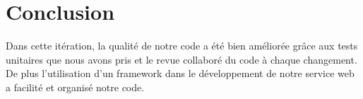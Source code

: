 \section*{Conclusion}

Dans cette itération, la qualité de notre code a été bien améliorée grâce aux
tests unitaires que nous avons pris et le revue collaboré du code à chaque
changement. De plus l'utilisation d'un framework dans le développement de notre
service web a facilité et organisé notre code.
